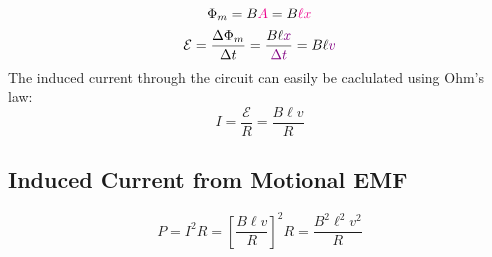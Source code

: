 %    
%
\begin{equation}
  \Phi_m=B{\color{magenta}A}=B{\color{magenta}\ell x}
\end{equation}
%
%    
\begin{equation}
  \mathcal E
  =\frac{\Delta\Phi_m}{\Delta t}
  =\frac{B\ell{\color{violet}x}}{\color{violet}\Delta t}
  =B\ell{\color{violet}v}
\end{equation}
The induced current through the circuit can easily be caclulated using Ohm's
law:
\begin{equation}
  I=\frac{\mathcal E}R=\frac{B\ell v}R
\end{equation}


\subsection{Induced Current from Motional EMF}

%
%
\begin{equation}
  P=I^2R=\left[\frac{B\ell v}R\right]^2R=\frac{B^2\ell^2v^2}R
\end{equation}
%


